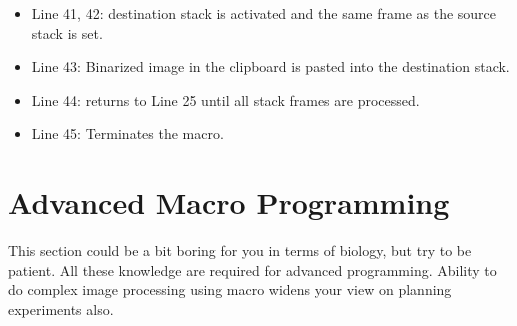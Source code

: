 \documentclass[11pt,a4paper,oneside]{report}
\begin{document}
\begin{itemize}
\item Line 41, 42: destination stack is activated and the same frame as the source stack is set. 

\item Line 43: Binarized image in the clipboard is pasted into the destination stack.

\item Line 44: returns to Line 25 until all stack frames are processed.

\item Line 45: Terminates the macro. 
\end{itemize}

\newpage

\section{Advanced Macro Programming}
This section could be a bit boring for you in terms of biology, but try to be patient. 
All these knowledge are required for advanced programming. 
Ability to do complex image processing using macro widens your view on planning experiments also.
\end{document}
